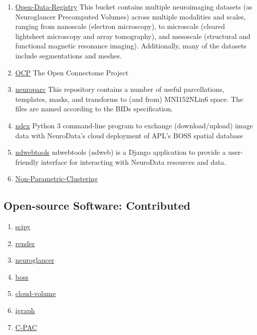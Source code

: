 \documentclass[10pt,colorlinks=true,urlcolor=blue]{moderncv}
\begin{document}
\begin{enumerate}
    \item \href{https://github.com/neurodata/open-data-registry}{Open-Data-Registry} This bucket contains multiple neuroimaging datasets (as Neuroglancer Precomputed Volumes) across multiple modalities and scales, ranging from nanoscale (electron microscopy), to microscale (cleared lightsheet microscopy and array tomography), and mesoscale (structural and functional magnetic resonance imaging). Additionally, many of the datasets include segmentations and meshes.
    \item \href{https://neurodata.io/ocp/}{OCP} The Open Connectome Project
    \item \href{https://github.com/neurodata/neuroparc}{neuroparc} This repository contains a number of useful parcellations, templates, masks, and transforms to (and from) MNI152NLin6 space. The files are named according to the BIDs specification.
    \item \href{https://github.com/neurodata/ndex}{ndex} Python 3 command-line program to exchange (download/upload) image data with NeuroData's cloud deployment of APL's BOSS spatial database
    \item \href{https://github.com/neurodata/ndwebtools}{ndwebtools} ndwebtools (ndweb) is a Django application to provide a user-friendly interface for interacting with NeuroData resources and data. 
    \item \href{https://github.com/neurodata/non-parametric-clustering}{Non-Parametric-Clustering}

\end{enumerate}



\subsection{Open-source Software: Contributed}

\begin{enumerate} 
    \item \href{https://github.com/neurodata/scipy}{scipy}
    \item \href{https://github.com/neurodata/render}{render}
    \item \href{https://github.com/neurodata/neuroglancer}{neuroglancer}
    \item \href{https://github.com/neurodata/boss}{boss}
    \item \href{https://github.com/neurodata/cloud-volume}{cloud-volume}
    \item \href{https://igraph.org}{igraph}
    \item \href{https://github.com/FCP-INDI/C-PAC}{C-PAC}
\end{enumerate}
    
\end{document}
